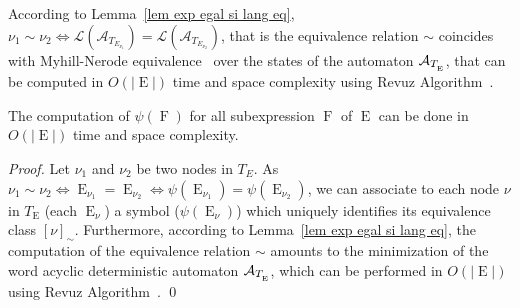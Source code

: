 \documentclass{llncs}
\DeclareMathOperator{\E}{E}
\DeclareMathOperator{\f}{F}
\begin{document}
 According to Lemma~\ref{lem exp egal si lang eq}, $\nu_1 \sim\nu_2 \Leftrightarrow \mathcal{L}(\mathcal{A}_{T_{E_{\nu_1}}})=\mathcal{L}(\mathcal{A}_{T_{E_{\nu_2}}})$, that is the equivalence relation $\sim$ coincides with Myhill-Nerode equivalence~\cite{Nerode} over the states of the automaton ${\cal A}_{T_{_{\E}}}$, that can be computed in $O(|\E|)$ time and space complexity using Revuz Algorithm~\cite{revuz}.
 
\begin{lemma}\label{lemma5}
The computation of $\psi(\f)$ for all subexpression $\f$ of $\E$ can be done in $O(|\E|)$ time and space complexity.
\end{lemma}
\begin{proof}
  Let $\nu_1$ and $\nu_2$ be two nodes in $T_E$. As $\nu_1 \sim \nu_2 \Leftrightarrow \E_{\nu_1}=\E_{\nu_2}\Leftrightarrow \psi(\E_{\nu_1})=\psi(\E_{\nu_2})$, we can associate to each 
node $\nu$ in $T_{\E}$ (each $\E_\nu$) a symbol ($\psi(\E_\nu)$) which uniquely identifies its equivalence class $[\nu]_{\sim}$. Furthermore, according to Lemma~\ref{lem exp egal si lang eq}, the computation of the equivalence relation $\sim$ amounts to the minimization of the word acyclic deterministic automaton ${\cal A}_{T_{_{\E}}}$, which can be performed in $O(|\E|)$ using Revuz Algorithm~\cite{revuz}. 
 \qed
\end{proof}
\end{document}
